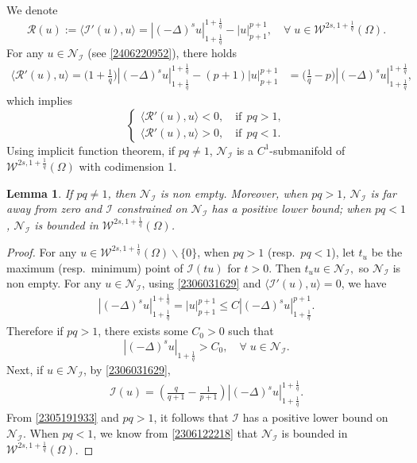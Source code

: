 \documentclass[10pt]{article}
\numberwithin{equation}{section}
\newtheorem{lemma}[theorem]{Lemma}
\numberwithin{equation}{section}
\begin{document}
We denote
\begin{equation}\label{2306031629}
\mathcal{R}(u):=\langle \mathcal{I}'(u), u\rangle=\left|(-\Delta)^su\right|_{1+\frac1q}^{1+\frac1q}-|u|_{p+1}^{p+1},\quad \forall\; u\in \mathcal{W}^{2s, 1+\frac1q}(\Omega).
\end{equation}
For any $u\in\mathcal{N}_{\mathcal{I}}$ (see \eqref{2406220952}), there holds
\[
\begin{aligned}
\langle \mathcal{R}'(u), u\rangle =\Big(1+\frac{1}{q}\Big)\left|(-\Delta)^su\right|_{1+\frac1q}^{1+\frac1q}-(p+1)|u|_{p+1}^{p+1} &=\Big(\frac{1}{q}-p\Big)\left|(-\Delta)^su\right|_{1+\frac1q}^{1+\frac1q},
\end{aligned}
\]
which implies
\begin{equation}\label{2306032031}
\begin{cases}
\langle \mathcal{R}'(u), u\rangle<0,\quad \text{if}~~pq>1,\\
\langle \mathcal{R}'(u), u\rangle>0,\quad \text{if}~~pq<1.
\end{cases}
\end{equation}
Using implicit function theorem, if $pq\neq 1$, $\mathcal{N}_{\mathcal{I}}$ is a $C^1$-submanifold of $\mathcal{W}^{2s, 1+\frac1q}(\Omega)$ with codimension 1.
\begin{lemma}\label{2306031952}
If $pq\neq 1$, then $\mathcal{N}_{\mathcal{I}}$ is non empty. Moreover, when $pq>1$, $\mathcal{N}_{\mathcal{I}}$ is far away from zero and $\mathcal{I}$ constrained on $\mathcal{N}_{\mathcal{I}}$ has a positive lower bound; when $pq<1$, $\mathcal{N}_{\mathcal{I}}$ is bounded in $\mathcal{W}^{2s, 1+\frac1q}(\Omega)$.
\end{lemma}
\begin{proof}
For any $u\in \mathcal{W}^{2s, 1+\frac1q}(\Omega)\backslash\{0\}$, when $pq>1$ (resp.~$pq<1$), let $t_u$ be the maximum (resp.~minimum) point of $\mathcal{I}(tu)$ for $t>0$. Then $t_uu\in \mathcal{N}_{\mathcal{I}},$
so $\mathcal{N}_{\mathcal{I}}$ is non empty. For any $u\in \mathcal{N}_{\mathcal{I}}$, using \eqref{2306031629} and $\langle \mathcal{I}'(u), u\rangle=0$, we have
\begin{equation}\label{2306122218}
\begin{aligned}
\left|(-\Delta)^su\right|_{1+\frac1q}^{1+\frac1q}=|u|_{p+1}^{p+1}\le C\left|(-\Delta)^su\right|_{1+\frac1q}^{p+1}.
\end{aligned}
\end{equation}
Therefore if $pq>1$, there exists some $C_0>0$ such that
\begin{equation}\label{2305191933}
\left|(-\Delta)^su\right|_{1+\frac1q}>C_0,\quad \forall\; u\in \mathcal{N}_{\mathcal{I}}.
\end{equation}
Next, if $u\in \mathcal{N}_{\mathcal{I}}$, by \eqref{2306031629},
\[
\begin{aligned}
\mathcal{I}(u)=\left(\frac{q}{q+1}-\frac1{p+1}\right)\left|(-\Delta)^su\right|_{1+\frac1q}^{1+\frac1q}.
\end{aligned}
\]
From \eqref{2305191933} and $pq>1$, it follows that $\mathcal{I}$ has a positive lower bound on $\mathcal{N}_{\mathcal{I}}$. When $pq<1$, we know from \eqref{2306122218} that $\mathcal{N}_{\mathcal{I}}$ is bounded in $\mathcal{W}^{2s, 1+\frac1q}(\Omega)$.
\end{proof}
\end{document}
